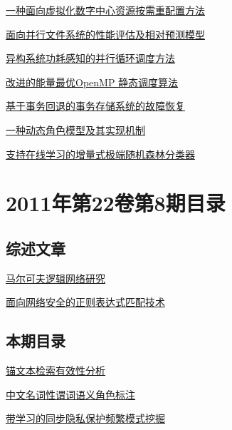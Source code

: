 \documentclass[a4paper]{article}
\begin{document}
\href{http://www.jos.org.cn/ch/reader/download_pdf.aspx?file_no=4056&year_id=2011&quarter_id=9&falg=1}{一种面向虚拟化数字中心资源按需重配置方法}

\href{http://www.jos.org.cn/ch/reader/download_pdf.aspx?file_no=3906&year_id=2011&quarter_id=9&falg=1}{面向并行文件系统的性能评估及相对预测模型}

\href{http://www.jos.org.cn/ch/reader/download_pdf.aspx?file_no=3883&year_id=2011&quarter_id=9&falg=1}{异构系统功耗感知的并行循环调度方法}

\href{http://www.jos.org.cn/ch/reader/download_pdf.aspx?file_no=3897&year_id=2011&quarter_id=9&falg=1}{改进的能量最优OpenMP 静态调度算法}

\href{http://www.jos.org.cn/ch/reader/download_pdf.aspx?file_no=3937&year_id=2011&quarter_id=9&falg=1}{基于事务回退的事务存储系统的故障恢复}

\href{http://www.jos.org.cn/ch/reader/download_pdf.aspx?file_no=3846&year_id=2011&quarter_id=9&falg=1}{一种动态角色模型及其实现机制}

\href{http://www.jos.org.cn/ch/reader/download_pdf.aspx?file_no=3827&year_id=2011&quarter_id=9&falg=1}{支持在线学习的增量式极端随机森林分类器}


\section{\textbf{2011年第22卷第8期目录}}
\subsection{综述文章}
\href{http://www.jos.org.cn/ch/reader/download_pdf.aspx?file_no=4053&year_id=2011&quarter_id=8&falg=1}{马尔可夫逻辑网络研究}

\href{http://www.jos.org.cn/ch/reader/download_pdf.aspx?file_no=4034&year_id=2011&quarter_id=8&falg=1}{面向网络安全的正则表达式匹配技术}

\subsection{本期目录}
\href{http://www.jos.org.cn/ch/reader/download_pdf.aspx?file_no=3873&year_id=2011&quarter_id=8&falg=1}{锚文本检索有效性分析}

\href{http://www.jos.org.cn/ch/reader/download_pdf.aspx?file_no=3885&year_id=2011&quarter_id=8&falg=1}{中文名词性谓词语义角色标注}

\href{http://www.jos.org.cn/ch/reader/download_pdf.aspx?file_no=4000&year_id=2011&quarter_id=8&falg=1}{带学习的同步隐私保护频繁模式挖掘}
\end{document}
